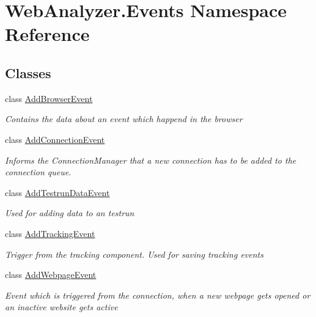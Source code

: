 \hypertarget{namespace_web_analyzer_1_1_events}{}\section{Web\+Analyzer.\+Events Namespace Reference}
\label{namespace_web_analyzer_1_1_events}
\subsection*{Classes}
\begin{DoxyCompactItemize}
\item 
class \hyperlink{class_web_analyzer_1_1_events_1_1_add_browser_event}{Add\+Browser\+Event}
\begin{DoxyCompactList}\small\item\em Contains the data about an event which happend in the browser \end{DoxyCompactList}\item 
class \hyperlink{class_web_analyzer_1_1_events_1_1_add_connection_event}{Add\+Connection\+Event}
\begin{DoxyCompactList}\small\item\em Informs the Connection\+Manager that a new connection has to be added to the connection queue. \end{DoxyCompactList}\item 
class \hyperlink{class_web_analyzer_1_1_events_1_1_add_testrun_data_event}{Add\+Testrun\+Data\+Event}
\begin{DoxyCompactList}\small\item\em Used for adding data to an testrun \end{DoxyCompactList}\item 
class \hyperlink{class_web_analyzer_1_1_events_1_1_add_tracking_event}{Add\+Tracking\+Event}
\begin{DoxyCompactList}\small\item\em Trigger from the tracking component. Used for saving tracking events \end{DoxyCompactList}\item 
class \hyperlink{class_web_analyzer_1_1_events_1_1_add_webpage_event}{Add\+Webpage\+Event}
\begin{DoxyCompactList}\small\item\em Event which is triggered from the connection, when a new webpage gets opened or an inactive website gets active \end{DoxyCompactList}\item 

\end{DoxyCompactItemize}
